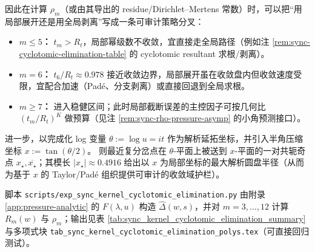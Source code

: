 \begin{remark}[真实解析半径：最近复分岔点钉死 \texorpdfstring{$t=0$}{t=0} 的收敛盘]
\par
因此在计算 \(\rho_m\)（或由其导出的 residue/Dirichlet--Mertens 常数）时，可以把“用局部展开还是用全局剥离”写成一条可审计策略分叉：
\begin{itemize}
  \item \textbf{\(m\le 5\)：} \(t_m>R_t\)，局部幂级数不收敛，宜直接走全局路径（例如注 \ref{rem:sync-cyclotomic-elimination-table} 的 cyclotomic resultant 求根/剥离）。
  \item \textbf{\(m=6\)：} \(t_6/R_t\approx 0.978\) 接近收敛边界，局部展开虽在收敛盘内但收敛速度受限，宜配合加速（Pad\'e、分支剥离）或直接回退到全局求根。
  \item \textbf{\(m\ge 7\)：} 进入稳健区间；此时局部截断误差的主控因子可按几何比 \((t_m/R_t)^K\) 做预算（见注 \ref{rem:sync-rho-pressure-asymp} 的小角预测接口）。
 \end{itemize}

\par
进一步，以完成化 log 变量 \(\theta:=\log u=it\) 作为解析延拓坐标，并引入半角压缩坐标
\(
x:=\tan(\theta/2)
\)。
则最近复分岔点在 \(\theta\)-平面上被送到 \(x\)-平面的一对共轭奇点 \(x_\star,\overline{x_\star}\)；其模长 \(|x_\star|\approx 0.4916\) 给出以 \(x\) 为局部坐标的最大解析圆盘半径（从而为基于 \(x\) 的 Taylor/Pad\'e 组织提供可审计的收敛域护栏）。

\end{remark}

\begin{remark}[可复现输出：\texorpdfstring{$m=3,\dots,12$}{m=3..12} 的 \texorpdfstring{$R_m$}{Rm} 与 \texorpdfstring{$\rho_m$}{rhom}]\label{rem:sync-cyclotomic-elimination-table}
脚本 \texttt{scripts/exp\_sync\_kernel\_cyclotomic\_elimination.py} 由附录 \ref{app:pressure-analytic} 的 $F(\lambda,u)$ 构造 $\widehat{\Delta}(w,s)$，并对 $m=3,\dots,12$ 计算 $R_m(w)$ 与 $\rho_m$；输出见表 \ref{tab:sync_kernel_cyclotomic_elimination_summary} 与多项式块 \texttt{tab\_sync\_kernel\_cyclotomic\_elimination\_polys.tex}（可直接回归测试）。
\end{remark}




